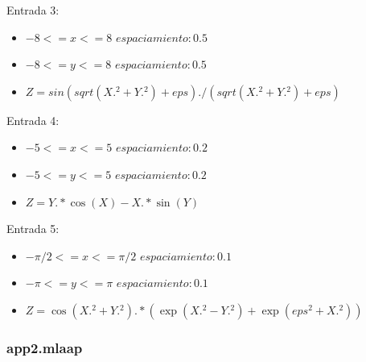 \documentclass{article}
\begin{document}
	Entrada 3:
	\begin{itemize}
		\item $-8 <= x <= 8$ $espaciamiento: 0.5$
		\item $-8 <= y <= 8$ $espaciamiento: 0.5$
		\item $Z = sin(sqrt(X .^ 2 + Y .^ 2) + eps)./(sqrt(X .^ 2 + Y .^ 2) + eps)$
	\end{itemize}
	Entrada 4:
	\begin{itemize}
		\item $-5 <= x <= 5$ $espaciamiento: 0.2$
		\item $-5 <= y <= 5$ $espaciamiento: 0.2$
		\item $Z = Y .* \cos(X) - X .* \sin(Y)$
	\end{itemize}
	Entrada 5:
	\begin{itemize}
		\item $-\pi / 2 <= x <= \pi / 2$ $espaciamiento: 0.1$
		\item $-\pi <= y <= \pi$ $espaciamiento: 0.1$
		\item $Z = \cos(X .^ 2 + Y .^ 2) .* (\exp(X .^ 2 - Y .^ 2) + \exp(eps ^ 2 + X .^ 2))$
	\end{itemize}
	
	\newpage
	
	\subsubsection{app2.mlaap}
	
\end{document}
